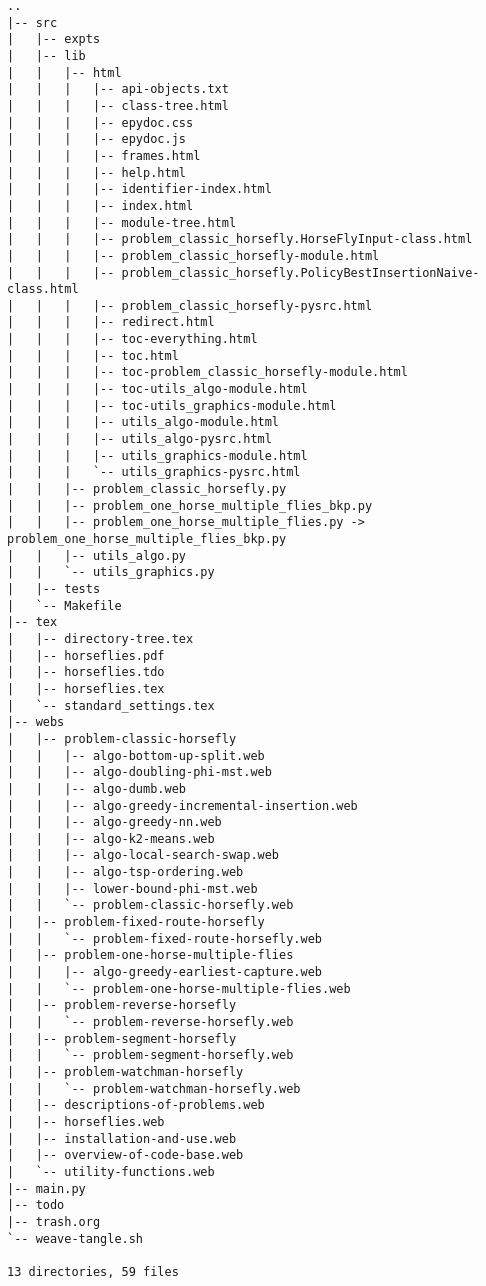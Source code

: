 \begin{verbatim}
..
|-- src
|   |-- expts
|   |-- lib
|   |   |-- html
|   |   |   |-- api-objects.txt
|   |   |   |-- class-tree.html
|   |   |   |-- epydoc.css
|   |   |   |-- epydoc.js
|   |   |   |-- frames.html
|   |   |   |-- help.html
|   |   |   |-- identifier-index.html
|   |   |   |-- index.html
|   |   |   |-- module-tree.html
|   |   |   |-- problem_classic_horsefly.HorseFlyInput-class.html
|   |   |   |-- problem_classic_horsefly-module.html
|   |   |   |-- problem_classic_horsefly.PolicyBestInsertionNaive-class.html
|   |   |   |-- problem_classic_horsefly-pysrc.html
|   |   |   |-- redirect.html
|   |   |   |-- toc-everything.html
|   |   |   |-- toc.html
|   |   |   |-- toc-problem_classic_horsefly-module.html
|   |   |   |-- toc-utils_algo-module.html
|   |   |   |-- toc-utils_graphics-module.html
|   |   |   |-- utils_algo-module.html
|   |   |   |-- utils_algo-pysrc.html
|   |   |   |-- utils_graphics-module.html
|   |   |   `-- utils_graphics-pysrc.html
|   |   |-- problem_classic_horsefly.py
|   |   |-- problem_one_horse_multiple_flies_bkp.py
|   |   |-- problem_one_horse_multiple_flies.py -> problem_one_horse_multiple_flies_bkp.py
|   |   |-- utils_algo.py
|   |   `-- utils_graphics.py
|   |-- tests
|   `-- Makefile
|-- tex
|   |-- directory-tree.tex
|   |-- horseflies.pdf
|   |-- horseflies.tdo
|   |-- horseflies.tex
|   `-- standard_settings.tex
|-- webs
|   |-- problem-classic-horsefly
|   |   |-- algo-bottom-up-split.web
|   |   |-- algo-doubling-phi-mst.web
|   |   |-- algo-dumb.web
|   |   |-- algo-greedy-incremental-insertion.web
|   |   |-- algo-greedy-nn.web
|   |   |-- algo-k2-means.web
|   |   |-- algo-local-search-swap.web
|   |   |-- algo-tsp-ordering.web
|   |   |-- lower-bound-phi-mst.web
|   |   `-- problem-classic-horsefly.web
|   |-- problem-fixed-route-horsefly
|   |   `-- problem-fixed-route-horsefly.web
|   |-- problem-one-horse-multiple-flies
|   |   |-- algo-greedy-earliest-capture.web
|   |   `-- problem-one-horse-multiple-flies.web
|   |-- problem-reverse-horsefly
|   |   `-- problem-reverse-horsefly.web
|   |-- problem-segment-horsefly
|   |   `-- problem-segment-horsefly.web
|   |-- problem-watchman-horsefly
|   |   `-- problem-watchman-horsefly.web
|   |-- descriptions-of-problems.web
|   |-- horseflies.web
|   |-- installation-and-use.web
|   |-- overview-of-code-base.web
|   `-- utility-functions.web
|-- main.py
|-- todo
|-- trash.org
`-- weave-tangle.sh

13 directories, 59 files
\end{verbatim}
